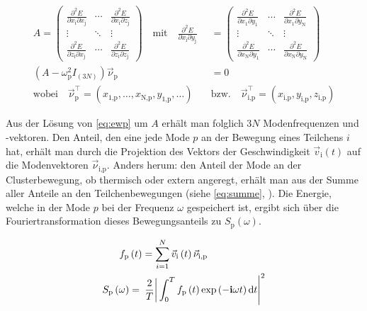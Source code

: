 \documentclass[numbers=noenddot,a4paper,notitlepage,twoside,BCOR15mm]{scrbook}
\newcommand{\diff}{\textnormal{d}}
\newcommand{\ix}[1]{_\text{#1}}
\newcommand{\imag}{\mathbf{i}}
\begin{document}
						\begin{align}
							A=
							\begin{pmatrix}
							\frac{\partial^2 E}{\partial x\ix{i} \partial x\ix{j}} & \cdots & \frac{\partial^2 E}{\partial x\ix{i} \partial z\ix{j}} \\ 
							\vdots & \ddots & \vdots \\ 
							\frac{\partial^2 E}{\partial z\ix{i} \partial x\ix{j}} & \cdots & \frac{\partial^2 E}{\partial z\ix{i} \partial z\ix{j}}
							\end{pmatrix} 
							\quad \text{mit} \quad \frac{\partial^2 E}{\partial x\ix{i}\partial y\ix{j}}&=
							\begin{pmatrix}
							\frac{\partial^2 E}{\partial x\ix{1} \partial y\ix{1}} & \cdots & \frac{\partial^2 E}{\partial x\ix{1} \partial y\ix{N}} \\ 
							\vdots & \ddots & \vdots \\ 
							\frac{\partial^2 E}{\partial x\ix{N} \partial y\ix{1}} & \cdots & \frac{\partial^2 E}{\partial x\ix{N} \partial y\ix{N}}
							\end{pmatrix}
							\label{eq:matrix} \\
							\left(A-\omega\ix{p}^2I_{(3N)}\right)\vec{\nu}\ix{p}&=0 \label{eq:ewp} \\ 
							\text{wobei} \quad \vec{\nu}\ix{p}^\top=\left(x\ix{1,p},\dots,x\ix{N,p},y\ix{1,p},\dots\right) \quad &\text{bzw.} \quad \vec{\nu}\ix{i,p}^\top=\left(x\ix{i,p},y\ix{i,p},z\ix{i,p}\right) \nonumber
						\end{align}

					Aus der Lösung von \autoref{eq:ewp} um $A$ erhält man folglich $3N$ Modenfrequenzen und -vektoren. Den Anteil, den eine jede Mode $p$ an der Bewegung eines Teilchens $i$ hat, erhält man durch die Projektion des Vektors der Geschwindigkeit $\vec{v}\ix{i}\left(t\right)$ auf die Modenvektoren $\vec{\nu}\ix{i,p}$. Anders herum: den Anteil der Mode an der Clusterbewegung, ob thermisch oder extern angeregt, erhält man aus der Summe aller Anteile an den Teilchenbewegungen (siehe \autoref{eq:summe}, \cite{Melzer03}). Die Energie, welche in der Mode $p$ bei der Frequenz $\omega$ gespeichert ist, ergibt sich über die Fouriertransformation dieses Bewegungsanteils zu $S\ix{p}\left(\omega\right)$.

						\begin{align}
							f\ix{p}&\left(t\right)=\sum_{i=1}^{N}\vec{v}\ix{i}\left(t\right)\vec{\nu}\ix{i,p} \label{eq:summe} \\
							S\ix{p}\left(\omega\right)&=\left.\left.\frac{2}{T}\right|\int_{0}^{T}f\ix{p}\left(t\right)\exp\left(-\imag\omega t\right)\diff t\right|^2 \label{eq:energiedicht}
						\end{align}
\end{document}
